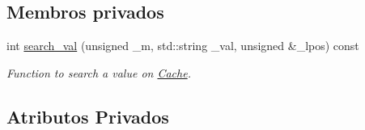 \subsection*{Membros privados}
\begin{DoxyCompactItemize}
\item 
int \hyperlink{classMappingSimulator_a35470460ee0e521cd9c5aa827a764901}{search\+\_\+val} (unsigned \+\_\+m, std\+::string \+\_\+val, unsigned \&\+\_\+lpos) const 
\begin{DoxyCompactList}\small\item\em Function to search a value on \hyperlink{classCache}{Cache}. \end{DoxyCompactList}\end{DoxyCompactItemize}
\subsection*{Atributos Privados}
